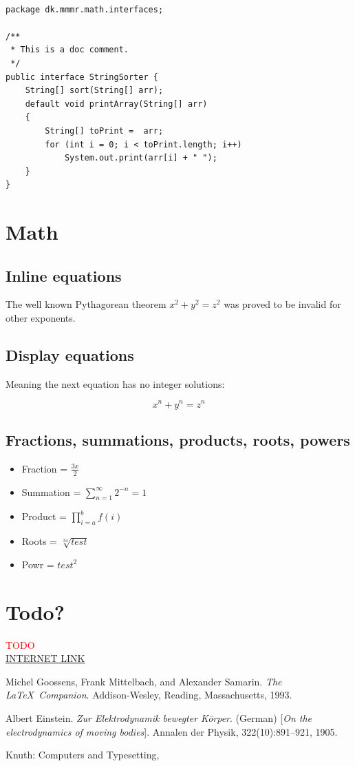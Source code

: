 \documentclass{book}
\newcommand\todo[1]{\textcolor{red}{#1}}
\begin{document}
\begin{lstlisting}

package dk.mmmr.math.interfaces;

/**
 * This is a doc comment.
 */
public interface StringSorter {
    String[] sort(String[] arr);
    default void printArray(String[] arr)
    {
        String[] toPrint =  arr;
        for (int i = 0; i < toPrint.length; i++)
            System.out.print(arr[i] + " ");
    }
}
\end{lstlisting}

\chapter{Math}
\section{Inline equations}
The well known Pythagorean theorem \(x^2 + y^2 = z^2\) was 
proved to be invalid for other exponents. 
\section{Display equations}
Meaning the next equation has no integer solutions:

\[ x^n + y^n = z^n \]
\section{Fractions, summations, products, roots, powers}
\begin{itemize}
  \item Fraction = \(\frac{3x}{2}\) 
  \item Summation = $\sum_{n=1}^{\infty} 2^{-n} = 1$
  \item Product = $\prod_{i=a}^{b} f(i)$
  \item Roots = \(\sqrt[34]{test}\)
  \item Powr = \(test^2\)
\end{itemize}


\chapter{Todo?}
\todo{TODO} \\
\href{https://www.youtube.com/watch?v=dQw4w9WgXcQ}{INTERNET LINK}

\begin{thebibliography}{9}
Michel Goossens, Frank Mittelbach, and Alexander Samarin. 
\textit{The \LaTeX\ Companion}. 
Addison-Wesley, Reading, Massachusetts, 1993.

Albert Einstein. 
\textit{Zur Elektrodynamik bewegter K{\"o}rper}. (German) 
[\textit{On the electrodynamics of moving bodies}]. 
Annalen der Physik, 322(10):891–921, 1905.

Knuth: Computers and Typesetting,

\end{thebibliography}
\end{document}
